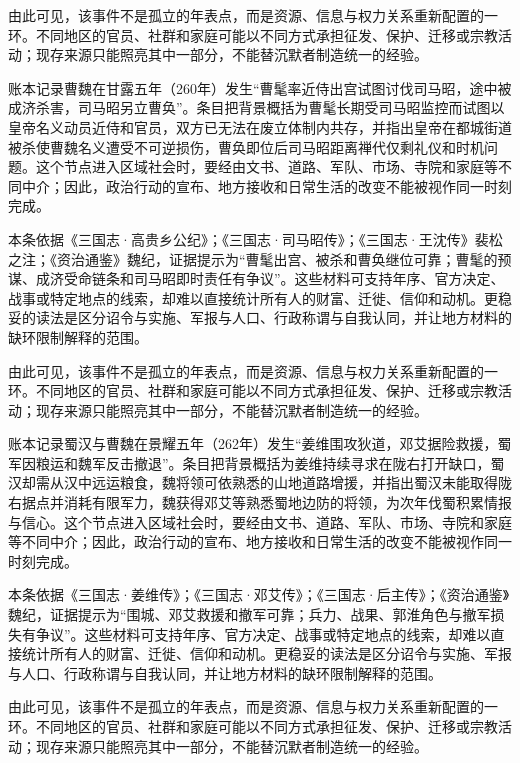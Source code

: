 由此可见，该事件不是孤立的年表点，而是资源、信息与权力关系重新配置的一环。不同地区的官员、社群和家庭可能以不同方式承担征发、保护、迁移或宗教活动；现存来源只能照亮其中一部分，不能替沉默者制造统一的经验。

账本记录曹魏在甘露五年（260年）发生“曹髦率近侍出宫试图讨伐司马昭，途中被成济杀害，司马昭另立曹奂”。条目把背景概括为曹髦长期受司马昭监控而试图以皇帝名义动员近侍和官员，双方已无法在废立体制内共存，并指出皇帝在都城街道被杀使曹魏名义遭受不可逆损伤，曹奂即位后司马昭距离禅代仅剩礼仪和时机问题。这个节点进入区域社会时，要经由文书、道路、军队、市场、寺院和家庭等不同中介；因此，政治行动的宣布、地方接收和日常生活的改变不能被视作同一时刻完成。

本条依据《三国志·高贵乡公纪》；《三国志·司马昭传》；《三国志·王沈传》裴松之注；《资治通鉴》魏纪，证据提示为“曹髦出宫、被杀和曹奂继位可靠；曹髦的预谋、成济受命链条和司马昭即时责任有争议”。这些材料可支持年序、官方决定、战事或特定地点的线索，却难以直接统计所有人的财富、迁徙、信仰和动机。更稳妥的读法是区分诏令与实施、军报与人口、行政称谓与自我认同，并让地方材料的缺环限制解释的范围。

由此可见，该事件不是孤立的年表点，而是资源、信息与权力关系重新配置的一环。不同地区的官员、社群和家庭可能以不同方式承担征发、保护、迁移或宗教活动；现存来源只能照亮其中一部分，不能替沉默者制造统一的经验。

账本记录蜀汉与曹魏在景耀五年（262年）发生“姜维围攻狄道，邓艾据险救援，蜀军因粮运和魏军反击撤退”。条目把背景概括为姜维持续寻求在陇右打开缺口，蜀汉却需从汉中远运粮食，魏将领可依熟悉的山地道路增援，并指出蜀汉未能取得陇右据点并消耗有限军力，魏获得邓艾等熟悉蜀地边防的将领，为次年伐蜀积累情报与信心。这个节点进入区域社会时，要经由文书、道路、军队、市场、寺院和家庭等不同中介；因此，政治行动的宣布、地方接收和日常生活的改变不能被视作同一时刻完成。

本条依据《三国志·姜维传》；《三国志·邓艾传》；《三国志·后主传》；《资治通鉴》魏纪，证据提示为“围城、邓艾救援和撤军可靠；兵力、战果、郭淮角色与撤军损失有争议”。这些材料可支持年序、官方决定、战事或特定地点的线索，却难以直接统计所有人的财富、迁徙、信仰和动机。更稳妥的读法是区分诏令与实施、军报与人口、行政称谓与自我认同，并让地方材料的缺环限制解释的范围。

由此可见，该事件不是孤立的年表点，而是资源、信息与权力关系重新配置的一环。不同地区的官员、社群和家庭可能以不同方式承担征发、保护、迁移或宗教活动；现存来源只能照亮其中一部分，不能替沉默者制造统一的经验。

